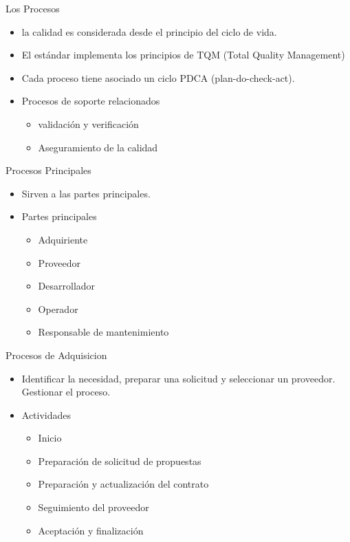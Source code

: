 \documentclass{beamer}
\begin{document}
			\begin{frame}{Los Procesos}
			\begin{itemize}
			\item la calidad es considerada desde el principio del ciclo de vida.
			\item El estándar implementa los principios de TQM (Total Quality Management)
			\item Cada proceso tiene asociado un ciclo PDCA (plan-do-check-act).
			\item Procesos de soporte relacionados
			\begin{itemize}
			\item validación y verificación 
			\item Aseguramiento de la calidad
			\end{itemize}
			\end{itemize}
			\end{frame}
			
			\begin{frame}{Procesos Principales}
			\begin{itemize}
			\item Sirven a las partes principales.
			\item Partes principales
			\begin{itemize}
			\item Adquiriente
			\item Proveedor
			\item Desarrollador
			\item Operador
			\item Responsable de mantenimiento
			\end{itemize}
			\end{itemize}
			\end{frame}
			
			\begin{frame}{Procesos de Adquisicion}
			\begin{itemize}
			\item Identificar la necesidad, preparar una solicitud y seleccionar un proveedor. Gestionar el proceso. 
			\item Actividades
			
			\begin{itemize}
			\item Inicio
			\item Preparación de solicitud de propuestas
			\item Preparación y actualización del contrato
			\item Seguimiento del proveedor
			\item Aceptación y finalización
			\end{itemize}
			\end{itemize}
			\end{frame}
			
\end{document}
